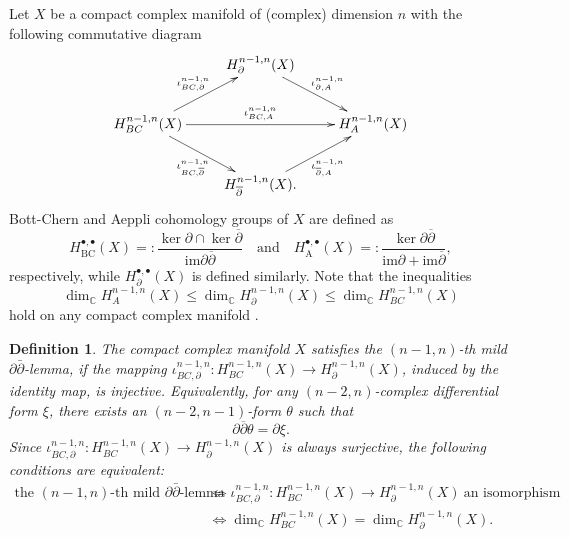\documentclass[12pt]{amsart}
\numberwithin{equation}{section}
\newtheorem{definition}  [theorem]     {Definition}
\renewcommand{\1}{\mathds{1}}
\newcommand{\db}{\overline{\partial}}
\newcommand{\im}{\mathrm{im}}
\renewcommand{\>}{\rightarrow}
\newcommand{\p}{\partial}
\def\p{\partial}
\def\b{\bar}
\begin{document}
Let $X$ be a compact complex manifold of (complex) dimension $n$
with the following commutative diagram
$$\xymatrix{      & H^{n-1,n}_{\p}(X) \ar[dr]^{\iota^{n-1,n}_{\p,A}} &            \\
 H^{n-1,n}_{BC}(X) \ar[ur]^{\iota^{n-1,n}_{BC,\p}} \ar[dr]_{\iota^{n-1,n}_{BC,\db}} \ar[rr]^{\iota^{n-1,n}_{BC,A}} & &  H^{n-1,n}_{A}(X)  \\
                & H^{n-1,n}_{\db}(X) \ar[ur]_{\iota^{n-1,n}_{\db,A}}. &          }$$
Bott-Chern and Aeppli cohomology groups of $X$ are defined as
$$H^{\bullet,\bullet}_{\mathrm{BC}}(X)=:\frac{\ker \p\cap \ker\db}{\im \p\db}\quad
\text{and}\quad H^{\bullet,\bullet}_{\mathrm{A}}(X)=:\frac{\ker
\p\db}{\im \p+\im\db},$$ respectively, while
$H^{\bullet,\bullet}_{\p}(X)$ is defined similarly. Note that the
inequalities
\[\dim_{\mathbb{C}}H^{n-1,n}_{A}(X) \leq \dim_{\mathbb{C}}H^{n-1,n}_{\p}(X) \leq \dim_{\mathbb{C}}H^{n-1,n}_{BC}(X)\]
hold on any compact complex manifold \cite[Corollary 3.3]{au}.

\begin{definition}\label{mild}
The compact complex manifold $X$ satisfies \emph{the $(n-1,n)$-th
mild $\p\b{\p}$-lemma}, if the mapping
$\iota_{BC,\p}^{n-1,n}:H^{n-1,n}_{BC}(X) \rightarrow
H^{n-1,n}_{\p}(X)$, induced by the identity map, is injective.
Equivalently, for any $(n-2,n)$-complex differential form $\xi$,
there exists an $(n-2,n-1)$-form $\theta$ such that
\[ \p \db \theta = \p \xi. \]
Since $\iota_{BC,\p}^{n-1,n}:H^{n-1,n}_{BC}(X) \rightarrow
H^{n-1,n}_{\p}(X)$ is always surjective, the following conditions
are equivalent:
\[ \begin{aligned}
\text{the $(n-1,n)$-th mild $\p\b{\p}$-lemma}
&\Longleftrightarrow \iota_{BC,\p}^{n-1,n}:H^{n-1,n}_{BC}(X) \rightarrow H^{n-1,n}_{\p}(X)\ \text{an isomorphism} \\
&\Longleftrightarrow \dim_{\mathbb{C}} H^{n-1,n}_{BC}(X) =
\dim_{\mathbb{C}} H^{n-1,n}_{\p}(X).
\end{aligned}\]
\end{definition}
\end{document}
